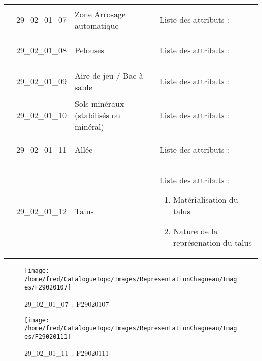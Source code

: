 \documentclass[12pt,titlepage,oneside]{book}
\begin{document}
\begin{supertabular}{|p{10cm}|c|p{13cm}|p{12cm}|}
                    & 29\_02\_01\_07 & Zone Arrosage automatique & Liste des attributs :
\begin{enumerate}
\end{enumerate}
\\


                    & 29\_02\_01\_08 & Pelouses & Liste des attributs :
\begin{enumerate}
\end{enumerate}
\\


                    & 29\_02\_01\_09 & Aire de jeu / Bac à sable & Liste des attributs :
\begin{enumerate}
\end{enumerate}
\\


                    & 29\_02\_01\_10 & Sols minéraux (stabilisés ou minéral) & Liste des attributs :
\begin{enumerate}
\end{enumerate}
\\


                    & 29\_02\_01\_11 & Allée & Liste des attributs :
\begin{enumerate}
\end{enumerate}
\\


                    & 29\_02\_01\_12 & Talus & Liste des attributs :
\begin{enumerate}
  \item Matérialisation du talus  \item Nature de la représenation du talus\end{enumerate}
\\
\hline
\end{supertabular}
\begin{figure}[h!]
  \hfill         %
  \begin{minipage}[t]{3cm}
    \begin{center}
      \texttt{[image: /home/fred/CatalogueTopo/Images/RepresentationChagneau/Images/F29020107]}
      \caption[~29\_02\_01\_07]{\small{29\_02\_01\_07~:} \tiny{F29020107}}\label{F29020107}
    \end{center}
  \end{minipage}
  \begin{minipage}[t]{3cm}
    \begin{center}
      \texttt{[image: /home/fred/CatalogueTopo/Images/RepresentationChagneau/Images/F29020111]}
      \caption[~29\_02\_01\_11]{\small{29\_02\_01\_11~:} \tiny{F29020111}}\label{F29020111}
    \end{center}
  \end{minipage}
\end{figure}
\end{document}
